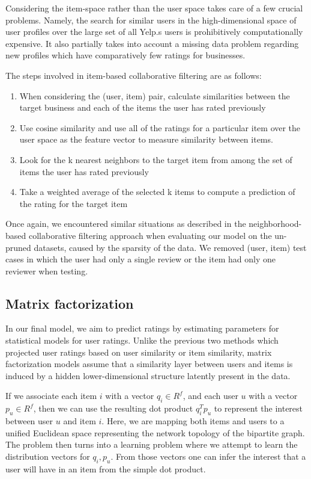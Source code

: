 \documentclass[letterpaper, 11 pt, conference]{ieeeconf}
\begin{document}
Considering the item-space rather than the user space takes care of a few
crucial problems. Namely, the search for similar users in the
high-dimensional space of user profiles over the large set of all Yelp.s
users is prohibitively computationally expensive. It also partially takes
into account a missing data problem regarding new profiles which have
comparatively few ratings for businesses.

The steps involved in item-based collaborative filtering are as follows:
\begin{enumerate}
\item When considering the (user, item) pair, calculate similarities between
  the target business and each of the items the user has rated previously
\item Use cosine similarity and use all of the ratings for a particular item
  over the user space as the feature vector to measure similarity between
  items.
\item Look for the k nearest neighbors to the target item from among the set of
  items the user has rated previously
\item Take a weighted average of the selected k items to compute a prediction
  of the rating for the target item
\end{enumerate}

Once again, we encountered similar situations as described in the
neighborhood-based collaborative filtering approach when evaluating our
model on the un-pruned datasets, caused by the sparsity of the data. We
removed (user, item) test cases in which the user had only a single review
or the item had only one reviewer when testing.

\subsection{Matrix factorization}

In our final model, we aim to predict ratings by estimating
parameters for statistical models for user ratings. Unlike the previous
two methods which projected user ratings based on user similarity or
item similarity, matrix factorization models assume that a similarity layer
between users and items is induced by a hidden lower-dimensional structure
latently present in the data.

If we associate each item $i$ with a vector $q_i \in R^f$, and each user $u$ with a
vector $p_u \in R^f$, then we can use the resulting dot product $q_i^Tp_u$ to represent
the interest between user $u$ and item $i$.
Here, we are mapping both items and users to a unified Euclidean space
representing the network topology of the bipartite graph.
The problem then turns into a
learning problem where we attempt to learn the distribution vectors for
$q_i,p_u$. From those vectors one can infer the interest that a user will
have in an item from the simple dot product.
\end{document}
